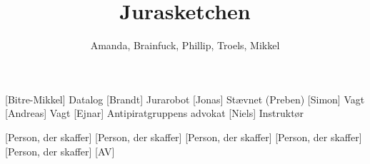 \documentclass[a4paper,11pt]{article}
\title{Jurasketchen}
\author{Amanda, Brainfuck, Phillip, Troels, Mikkel}
\begin{document}
\maketitle

\begin{roles}
[Bitre-Mikkel] Datalog
[Brandt] Jurarobot
[Jonas] Stævnet (Preben)
[Simon] Vagt
[Andreas] Vagt
[Ejnar] Antipiratgruppens advokat
[Niels] Instruktør
\end{roles}

\begin{props}
[Person, der skaffer]
[Person, der skaffer]
[Person, der skaffer]
[Person, der skaffer]
[Person, der skaffer]
[AV]
\end{props}
\end{document}
